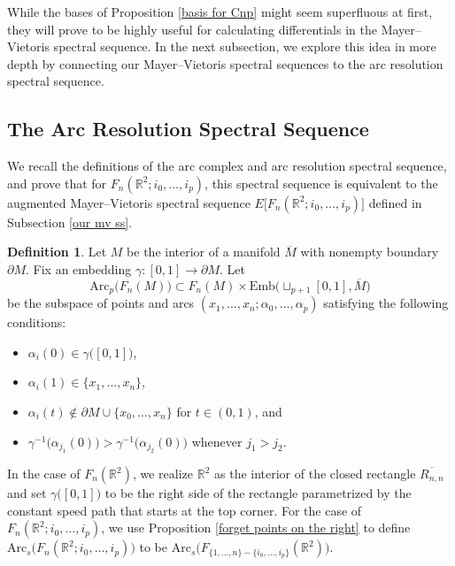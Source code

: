\documentclass[pagebackref,colorlinks,citecolor=blue,linkcolor=blue,urlcolor=blue,filecolor=blue]{article}
\theoremstyle{definition}\newtheorem{definition}[thm]{Definition}
\theoremstyle{definition}
\newtheorem{defn}[thm]{Definition}
\newcommand{\R}{\ensuremath{\mathbb{R}}}
\begin{document}
While the bases of Proposition \ref{basis for Cnp} might seem superfluous at first, they will prove to be highly useful for calculating differentials in the Mayer--Vietoris spectral sequence.
In the next subsection, we explore this idea in more depth by connecting our Mayer--Vietoris spectral sequences to the arc resolution spectral sequence.

\subsection{The Arc Resolution Spectral Sequence}

We recall the definitions of the arc complex and arc resolution spectral sequence, and prove that for $F_{n}(\R^{2};i_{0}, \dots, i_{p})$, this spectral sequence is equivalent to the augmented Mayer--Vietoris spectral sequence $E\big[F_{n}(\R^{2};i_{0}, \dots, i_{p})\big]$ defined in Subsection \ref{our mv ss}.

\begin{defn}
Let $M$ be the interior of a manifold $\overline{M}$ with nonempty boundary $\partial M$.
Fix an embedding $\gamma:[0,1]\to \partial M$.
Let
\[
\text{Arc}_{p}\big(F_{n}(M)\big)\subset F_{n}(M)\times \text{Emb}\big(\sqcup_{p+1}[0,1], \overline{M}\big)
\]
be the subspace of points and arcs $(x_{1},\dots, x_{n};\alpha_{0}, \dots, \alpha_{p})$ satisfying the following conditions:
\begin{itemize}
    \item $\alpha_{i}(0)\in\gamma\big([0,1]\big)$,
    \item $\alpha_{i}(1)\in\{x_{1},\dots, x_{n}\}$,
    \item $\alpha_{i}(t)\notin \partial M\cup \{x_{0}, \dots, x_{n}\}$ for $t\in (0,1)$, and 
    \item $\gamma^{-1}\big(\alpha_{j_{1}}(0)\big)>\gamma^{-1}\big(\alpha_{j_{2}}(0)\big)$ whenever $j_{1}>j_{2}$.
\end{itemize}
\end{defn}

In the case of $F_{n}(\R^{2})$, we realize $\R^{2}$ as the interior of the closed rectangle $\overline{R_{n,n}}$ and set $\gamma\big([0,1]\big)$ to be the right side of the rectangle parametrized by the constant speed path that starts at the top corner.
For the case of $F_{n}(\R^{2}; i_{0}, \dots, i_{p})$, we use Proposition \ref{forget points on the right} to define $\text{Arc}_{s}\big(F_{n}(\R^{2}; i_{0}, \dots, i_{p})\big)$ to be $\text{Arc}_{s}\big(F_{\{1,\dots, n\}-\{i_{0},\dots, i_{p}\}}(\R^{2})\big)$. 
\end{document}
